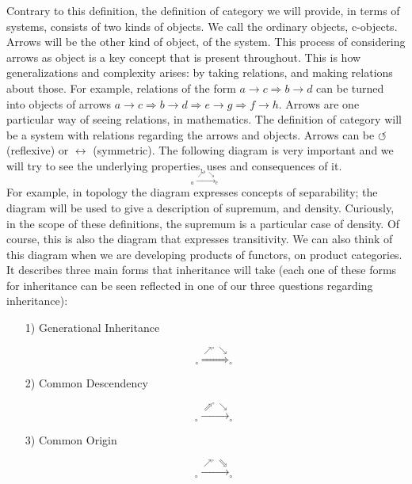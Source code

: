 \documentclass [12pt]{book}
\begin{document}
Contrary to this definition, the definition of category we will provide, in terms of systems, consists of two kinds of objects. We call the ordinary objects, c-objects. Arrows will be the other kind of object, of the system. This process of considering arrows as object is a key concept that is present throughout. This is how generalizations and complexity arises: by taking relations, and making relations about those. For example, relations of the form $a\rightarrow c\Rightarrow b\rightarrow d$ can be turned into objects of arrows $a\rightarrow c\Rightarrow b\rightarrow d\Longrightarrow e\rightarrow g\Rightarrow f\rightarrow h$. Arrows are one particular way of seeing relations, in mathematics. The definition of category will be a system with relations regarding the arrows and objects. Arrows can be $\circlearrowleft$ (reflexive) or $\leftrightarrow$ (symmetric). The following diagram is very important and we will try to see the underlying properties, uses and consequences of it.  $$_{_a\stackrel{\nearrow^b\searrow}\longrightarrow_c}$$For example, in topology the diagram expresses concepts of separability; the diagram will be used to give a description of supremum, and density. Curiously, in the scope of these definitions, the supremum is a particular case of density. Of course, this is also the diagram that expresses transitivity. We can also think of this diagram when we are developing products of functors, on product categories. It describes three main forms that inheritance will take (each one of these forms for inheritance can be seen reflected in one of our three questions regarding inheritance):

\begin{itemize}

\item[1)] Generational Inheritance

\[_{\circ}\stackrel{\nearrow^
{\circ}\searrow}\Longrightarrow_{\circ}\]

\item[2)] Common Descendency

\[_{\circ}\stackrel{\Nearrow^
{\circ}\searrow}\longrightarrow_{\circ}\]

\item[3)] Common Origin

\[_{\circ}\stackrel{\nearrow^
{\circ}\Searrow}\longrightarrow_{\circ}\]

\end{itemize}
\end{document}
